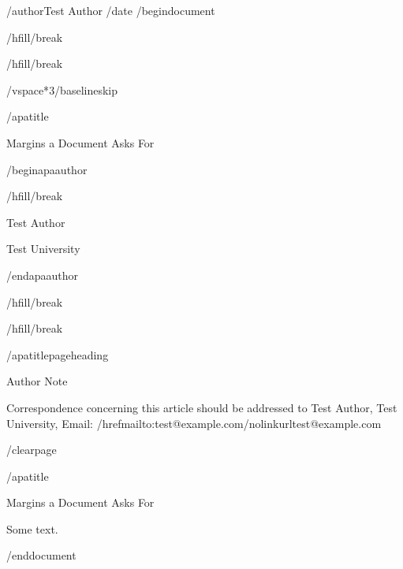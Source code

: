 /author{Test Author}
/date{}
/begin{document}


/hfill/break

/hfill/break

/vspace*{3/baselineskip}

/apatitle{

Margins a Document Asks For

}

/begin{apaauthor}

/hfill/break

Test Author

Test University

/end{apaauthor}

/hfill/break

/hfill/break

/apatitlepageheading{

Author Note

}

Correspondence concerning this article should be addressed to Test
Author, Test University, Email:
/href{mailto:test@example.com}{/nolinkurl{test@example.com}}

/clearpage

/apatitle{

Margins a Document Asks For

}

Some text.




/end{document}
